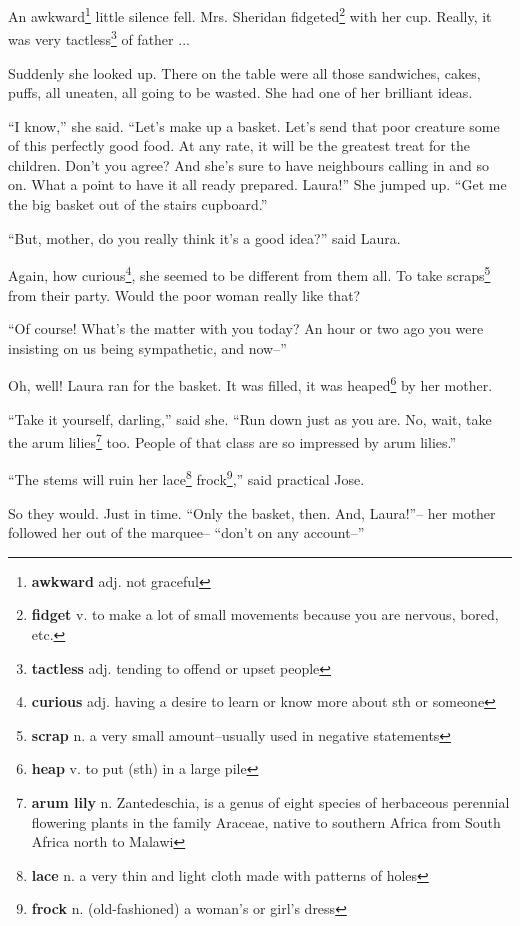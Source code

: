 An awkward\footnote{\textbf{awkward} adj. not graceful} little silence fell. Mrs. Sheridan fidgeted\footnote{\textbf{fidget} v. to make a lot of small movements because you are nervous, bored, etc.} with her cup. Really, it was very tactless\footnote{\textbf{tactless} adj. tending to offend or upset people} of father ...

Suddenly she looked up. There on the table were all those sandwiches, cakes, puffs, all uneaten, all going to be wasted. She had one of her brilliant ideas.

``I know,'' she said. ``Let's make up a basket. Let's send that poor creature some of this perfectly good food. At any rate, it will be the greatest treat for the children. Don't you agree? And she's sure to have neighbours calling in and so on. What a point to have it all ready prepared. Laura!'' She jumped up. ``Get me the big basket out of the stairs cupboard.''

``But, mother, do you really think it's a good idea?'' said Laura.

Again, how curious\footnote{\textbf{curious} adj. having a desire to learn or know more about sth or someone}, she seemed to be different from them all. To take scraps\footnote{\textbf{scrap} n. a very small amount--usually used in negative statements} from their party. Would the poor woman really like that?

``Of course! What's the matter with you today? An hour or two ago you were insisting on us being sympathetic, and now--''

Oh, well! Laura ran for the basket. It was filled, it was heaped\footnote{\textbf{heap} v. to put (sth) in a large pile} by her mother.

``Take it yourself, darling,'' said she. ``Run down just as you are. No, wait, take the arum lilies\footnote{\textbf{arum lily} n. Zantedeschia,  is a genus of eight species of herbaceous perennial flowering plants in the family Araceae, native to southern Africa from South Africa north to Malawi} too. People of that class are so impressed by arum lilies.''

``The stems will ruin her lace\footnote{\textbf{lace} n. a very thin and light cloth made with patterns of holes} frock\footnote{\textbf{frock} n. (old-fashioned) a woman's or girl's dress},'' said practical Jose.

So they would. Just in time. ``Only the basket, then. And, Laura!''-- her mother followed her out of the marquee-- ``don't on any account--''

